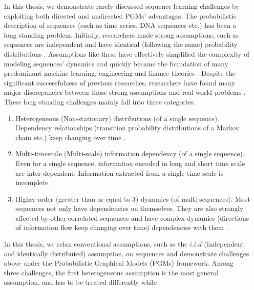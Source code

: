 In this thesis, we demonstrate rarely discussed sequence learning
challenges by exploiting both directed and undirected PGMs'
advantages. The probabilistic description of sequences (such as
time series, DNA sequences etc.) has been a long standing
problem. Initially, researchers made strong assumptions, such as
sequences are independent and have identical (following the same)
probability distributions
\cite{bachelier1900theorie,friedman1953methodology}. Assumptions
like these have effectively simplified the complexity of modeling
sequences' dynamics and quickly became the foundation of many
predominant machine learning, engineering and finance theories
\cite{jegadeesh1993returns,shiller1980stock,
  sharpe1964capital,carhart1997persistence,sargent1993bounded}.
Despite the significant successfulness of previous researches,
researchers have found many major discrepancies between those
strong assumptions and real world problems
\cite{lux2008markov,mandelbrot1963new,lux2007forecasting,
  abry2019shuffling, li2019multi, mandelbrot1997multifractal}.
These long standing challenges mainly fall into three categories:
%
\begin{enumerate}
\item Heterogeneous (Non-stationary) distributions (of a single
  sequence). Dependency relationships (\eg transition probability
  distributions of a Markov chain etc.) keep changing over time
  \cite{ross1996stochastic}.
\item Multi-timescale (Multi-scale) information dependency (of a
  single sequence). Even for a single sequence, information
  encoded in long and short time scale are inter-dependent.
  Information extracted from a single time scale is incomplete
  \cite{mandelbrot1997multifractal}.
\item Higher-order (greater than or equal to 3) dynamics (of
  multi-sequences). Most sequences not only have dependencies on
  themselves. They are also strongly affected by other correlated
  sequences and have complex dynamics (\eg directions of
  information flow keep changing over time) dependencies with
  them
  \cite{lo1990contrarian,badrinath1995shepherds,mcqueen1996delayed}.
\end{enumerate}
%
In this thesis, we relax conventional assumptions, such as the
$i.i.d$ (Independent and identically distributed) assumption, on
sequences and demonstrate challenges above under the
Probabilistic Graphical Models (PGMs) framework. Among three
challenges, the first heterogeneous assumption is the most
general assumption, and has to be treated differently while
